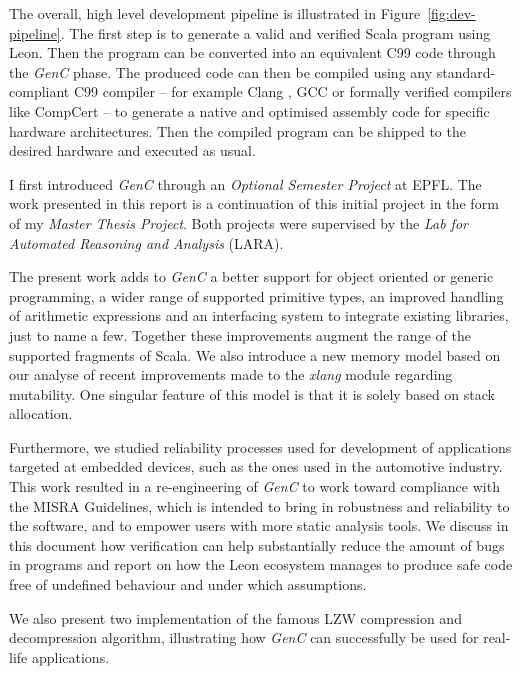 \documentclass[a4paper,twoside]{article}
\newcommand{\GenC}{\emph{GenC}\xspace}
\newcommand{\RefFig}[1]{Figure~\ref{#1}}
\begin{document}
The overall, high level development pipeline is illustrated in
\RefFig{fig:dev-pipeline}. The first step is to generate a valid and verified
Scala program using Leon. Then the program can be converted into an equivalent
C99 code through the \GenC phase.  The produced code can then be compiled using
any standard-compliant C99 compiler -- for example Clang \cite{clang}, GCC
\cite{gcc} or formally verified compilers like CompCert \cite{Leroy-backend}
\cite{compcert} -- to generate a native and optimised assembly code for specific
hardware architectures. Then the compiled program can be shipped to the desired
hardware and executed as usual.

I first introduced \GenC through an \emph{Optional Semester Project} at EPFL.
The work presented in this report is a continuation of this initial project in
the form of my \emph{Master Thesis Project}. Both projects were supervised by
the \emph{Lab for Automated Reasoning and Analysis} (LARA).

The present work adds to \GenC a better support for object oriented or generic
programming, a wider range of supported primitive types, an improved handling of
arithmetic expressions and an interfacing system to integrate existing
libraries, just to name a few. Together these improvements augment the range of
the supported fragments of Scala. We also introduce a new memory model based on
our analyse of recent improvements made to the \emph{xlang} module
\cite{Blanc:2013:OLV:2489837.2489838} \cite{xlang} regarding mutability. One
singular feature of this model is that it is solely based on stack allocation.

Furthermore, we studied reliability processes used for development of
applications targeted at embedded devices, such as the ones used in the
automotive industry. This work resulted in a re-engineering of \GenC to work
toward compliance with the MISRA Guidelines, which is intended to bring in
robustness and reliability to the software, and to empower users with more
static analysis tools. We discuss in this document how verification can help
substantially reduce the amount of bugs in programs and report on how the Leon
ecosystem manages to produce safe code free of undefined behaviour and under
which assumptions.

We also present two implementation of the famous LZW \cite{welch1985high}
compression and decompression algorithm, illustrating how \GenC can
successfully be used for real-life applications.
\end{document}
